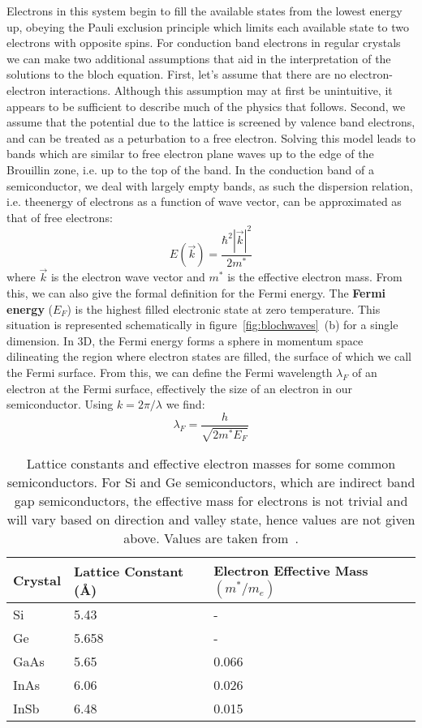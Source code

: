 Electrons in this system begin to fill the available states from the lowest energy up, obeying the Pauli exclusion principle which limits
each available state to two electrons with opposite spins. For conduction band electrons in regular crystals we can make
two additional assumptions that aid in the interpretation of the solutions to the bloch equation. First, let's assume that
there are no electron-electron interactions. Although this assumption may at first be unintuitive, it appears
to be sufficient to describe much of the physics that follows. Second, we assume that the potential due to the
lattice is screened by valence band electrons, and can be treated as a peturbation to a free electron. Solving
this model leads to bands which are similar to free electron plane waves up to the edge of the Brouillin zone, i.e.
up to the top of the band. In the conduction band of a semiconductor, we deal with largely empty bands, as such
the dispersion relation, i.e. theenergy of electrons as a function of wave vector, can be approximated as that of free electrons:
\begin{equation}
  E\left(\vec{k}\right) = \frac{\hbar^2 |\vec{k}|^2}{2m^*}
\end{equation}
where $\vec{k}$ is the electron wave vector and $m^*$ is the effective electron mass. From this, we can also give the
formal definition for the Fermi energy. The \textbf{Fermi energy} ($E_F$) is the highest filled electronic state
at zero temperature. This situation is represented schematically in figure~\ref{fig:blochwaves}~(b) for a single dimension.
In 3D, the Fermi energy forms a sphere in momentum space dilineating the region where electron states are filled, the surface
of which we call the Fermi surface. From this, we can define the Fermi wavelength $\lambda_F$ of an electron at the Fermi
surface, effectively the size of an electron in our semiconductor. Using $k = 2\pi/\lambda$ we find:
\begin{equation}
  \lambda_F = \frac{h}{\sqrt{2m^*E_F}}
\end{equation}

\begin{table}
  \centering
  \begin{tabular}{|l|l|l|} 
   \hline
   Crystal & Lattice Constant (\si{\angstrom}) & Electron Effective Mass$(m^*/m_e)$ \\ 
   \hline
   Si & 5.43 & - \\
   Ge & 5.658 & - \\
   GaAs & 5.65 & 0.066 \\ 
   InAs & 6.06 & 0.026 \\ 
   InSb & 6.48 & 0.015 \\
   \hline
  \end{tabular}
  \caption[Properties of some common Semiconductors]
  {Lattice constants and effective electron masses for some common semiconductors. For Si and Ge semiconductors, which are
  indirect band gap semiconductors, the effective mass for electrons is not trivial and will vary based
  on direction and valley state, hence values are not given above. Values are taken from~\cite{Kittel2004,InSbParam}.}
  \label{tab:semiprop}
\end{table}

